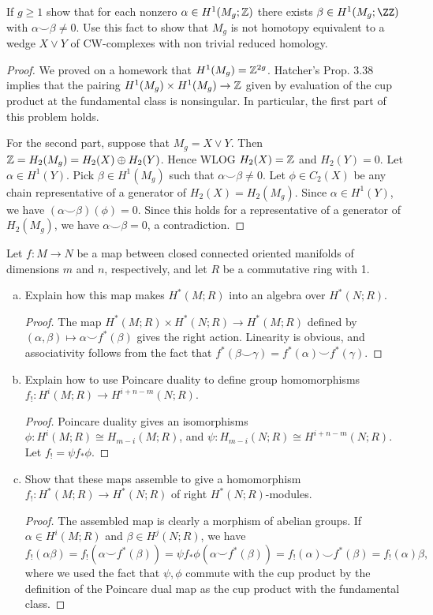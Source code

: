 \documentclass{article}
\begin{document}
 If $g \geq 1$ show that for each nonzero $\alpha \in H^1(M_g; \mathbb{Z})$ there exists $\beta \in H^1(M_g;\ZZ)$ with
$\alpha \smile \beta \neq 0$. Use this fact to show that $M_g$ is not homotopy equivalent to a wedge $X \vee Y$ of 
CW-complexes with non trivial reduced homology.

\begin{proof}
We proved on a homework that $H^1(M_g) = \mathbb{Z}^{2g}$. Hatcher's Prop. 3.38 implies that the pairing
$H^1(M_g) \times H^1(M_g) \to \mathbb{Z}$ given by evaluation of the cup product at the fundamental class is nonsingular. 
In particular, the first part of this problem holds.

For the second part, suppose that $M_g = X \vee Y$. Then $\mathbb{Z} = H_2(M_g) = H_2(X) \oplus H_2(Y)$.  Hence WLOG $H_2(X) = \mathbb{Z}$ and $H_2(Y) = 0$. 
Let $\alpha \in H^1(Y)$. Pick $\beta \in H^1(M_g)$ such that $\alpha \smile \beta \neq 0$.
Let $\phi \in C_2(X)$ be any chain representative of a generator of $H_2(X) = H_2(M_g)$.  Since $\alpha \in H^1(Y)$, we have
$(\alpha \smile \beta)(\phi) = 0$.  Since this holds for a representative of a generator of $H_2(M_g)$, we have $\alpha \smile \beta = 0$, a contradiction.
\end{proof}

 Let $f: M \to N$ be a map between closed connected oriented manifolds of dimensions $m$ and $n$, respectively, and let $R$ be a commutative ring with 1.
\begin{enumerate}[a.]
\item Explain how this map makes $H^*(M; R)$ into an algebra over $H^*(N; R)$.
\begin{proof}
The map $H^*(M; R) \times H^*(N; R) \to  H^*(M; R)$ defined by $(\alpha, \beta) \mapsto \alpha \smile f^*(\beta)$ gives the right action. Linearity is obvious, and associativity follows from the fact that $f^*(\beta \smile \gamma) = f^*(\alpha) \smile f^*(\gamma)$.
\end{proof}
\item Explain how to use Poincare duality to define group homomorphisms $f_!: H^i(M;R) \to H^{i+n-m}(N;R)$.
\begin{proof}
Poincare duality gives an isomorphisms $\phi:H^i(M;R) \cong H_{m-i}(M;R)$, and 
$\psi:H_{m-i}(N;R) \cong H^{i+n-m}(N;R)$. Let $f_! = \psi f_* \phi$.
\end{proof}
\item Show that these maps assemble to give a homomorphism $f_!:H^*(M;R) \to H^*(N;R)$ of right $H^*(N;R)$-modules.
\begin{proof}
The assembled map is clearly a morphism of abelian groups. If $\alpha \in H^i(M;R)$ and $\beta \in H^j(N;R)$,
we have $f_!(\alpha \beta)= f_!(\alpha \smile f^*(\beta)) = \psi f_* \phi (\alpha \smile f^*(\beta))
= f_!(\alpha) \smile f^*(\beta)
= f_!(\alpha) \beta,$ 
where we used the fact that $\psi, \phi$ commute with the cup product by the definition of the Poincare dual map as
the cup product with the fundamental class.
\end{proof}
\end{enumerate}
\end{document}
